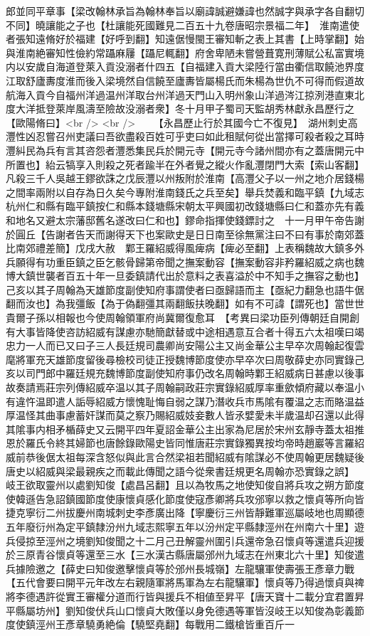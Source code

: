 郎並同平章事【梁改翰林承旨為翰林奉旨以廟諱誠避嫌諱也然誠字與承字各自翻切不同】曉讓能之子也【杜讓能死國難見二百五十九卷唐昭宗景福二年】　淮南遣使者張知遠脩好於福建【好呼到翻】知遠倨慢閩王審知斬之表上其書【上時掌翻】始與淮南絶審知性儉約常躡麻屨【躡尼輒翻】府舍卑陋未嘗營葺寛刑薄賦公私富實境内以安歲自海道登萊入貢没溺者什四五【自福建入貢大梁陸行當由衢信取饒池界度江取舒廬夀度淮而後入梁境然自信饒至廬夀皆屬楊氏而朱楊為世仇不可得而假道故航海入貢今自福州洋過温州洋取台州洋過天門山入明州象山洋過涔江掠洌港直東北度大洋抵登萊岸風濤至險故没溺者衆】冬十月甲子蜀司天監胡秀林獻永昌歷行之【歐陽脩曰】<br />
<br />
　　【永昌歷止行於其國今亡不復見】　湖州刺史高灃性凶忍嘗召州吏議曰吾欲盡殺百姓可乎吏曰如此租賦何從出當擇可殺者殺之耳時灃糾民為兵有言其咨怨者灃悉集民兵於開元寺【開元寺今諸州間亦有之蓋唐開元中所置也】紿云犒享入則殺之死者踰半在外者覺之縱火作亂灃閉門大索【索山客翻】凡殺三千人吳越王鏐欲誅之戊辰灃以州叛附於淮南【高灃父子以一州之地介居錢楊之間率兩附以自存為日久矣今專附淮南錢氏之兵至矣】舉兵焚義和臨平鎮【九域志杭州仁和縣有臨平鎮按仁和縣本錢塘縣宋朝太平興國初改錢塘縣曰仁和蓋亦先有義和地名又避太宗藩邸舊名遂改曰仁和也】鏐命指揮使錢鏢討之　十一月甲午帝告謝於圓丘【告謝者告天而謝得天下也案歐史是日日南至徐無黨注曰不曰有事於南郊蓋比南郊禮差簡】戊戌大赦　鄴王羅紹威得風痺病【痺必至翻】上表稱魏故大鎮多外兵願得有功重臣鎮之臣乞骸骨歸第帝聞之撫案動容【撫案動容非矜羅紹威之病也魏博大鎮世襲者百五十年一旦委鎮請代出於意料之表喜溢於中不知手之撫容之動也】己亥以其子周翰為天雄節度副使知府事謂使者曰亟歸語而主【亟紀力翻急也語牛倨翻而汝也】為我彊飯【為于偽翻彊其兩翻飯扶晚翻】如有不可諱【謂死也】當世世貴爾子孫以相報也今使周翰領軍府尚冀爾復愈耳　【考異曰梁功臣列傳朝廷自開創有大事皆降使咨訪紹威有謀慮亦馳簡獻替或中途相遇意互合者十得五六太祖嘆曰竭忠力一人而已又曰子三人長廷規司農卿尚安陽公主又尚金華公主早卒次周翰起復雲麾將軍充天雄節度留後尋檢校司徒正授魏博節度使亦早卒次曰周敬薛史亦同實錄己亥以司門郎中羅廷規充魏博節度副使知府事仍改名周翰時鄴王紹威病日甚慮以後事故奏請焉莊宗列傳紹威卒温以其子周翰嗣政莊宗實錄紹威厚率重歛傾府藏以奉温小有違忤温即遣人詬辱紹威方懷愧耻悔自弱之謀乃潛收兵市馬隂有覆温之志而賂温益厚温怪其曲事慮蓄奸謀而莫之察乃賜紹威妓妾數人皆氶嬖愛未半歲温却召還以此得其隂事内相矛楯薛史又云開平四年夏詔金華公主出家為尼居於宋州玄靜寺蓋太祖推恩於羅氏令終其婦節也唐餘錄歐陽史皆同惟唐莊宗實錄獨異按均帝時趙巖等言羅紹威前恭後倨太祖每深含怒似與此言合然梁祖若聞紹威有隂謀必不使周翰更居魏疑後唐史以紹威與梁最親疾之而載此傳聞之語今從衆書廷規更名周翰亦恐實錄之誤】　岐王欲取靈州以處劉知俊【處昌呂翻】且以為牧馬之地使知俊自將兵攻之朔方節度使韓遜告急詔鎮國節度使康懷貞感化節度使寇彥卿將兵攻邠寧以救之懷貞等所向皆捷克寧衍二州拔慶州南城刺史李彥廣出降【寧慶衍三州皆靜難軍巡屬岐地也周顯德五年廢衍州為定平鎮隸汾州九域志熙寧五年以汾州定平縣隸涇州在州南六十里】遊兵侵掠至涇州之境劉知俊聞之十二月己丑解靈州圍引兵還帝急召懷貞等還遣兵迎援於三原青谷懷貞等還至三水【三水漢古縣唐屬邠州九域志在州東北六十里】知俊遣兵據險邀之【薛史曰知俊邀擊懷貞等於邠州長城嶺】左龍驤軍使壽張王彥章力戰【五代會要曰開平元年改左右親隨軍將馬軍為左右龍驤軍】懷貞等乃得過懷貞與禆將李德遇許從實王審權分道而行皆與援兵不相値至昇平【唐天寶十二載分宜君置昇平縣屬坊州】劉知俊伏兵山口懷貞大敗僅以身免德遇等軍皆沒岐王以知俊為彰義節度使鎮涇州王彥章驍勇絶倫【驍堅堯翻】每戰用二鐵槍皆重百斤一